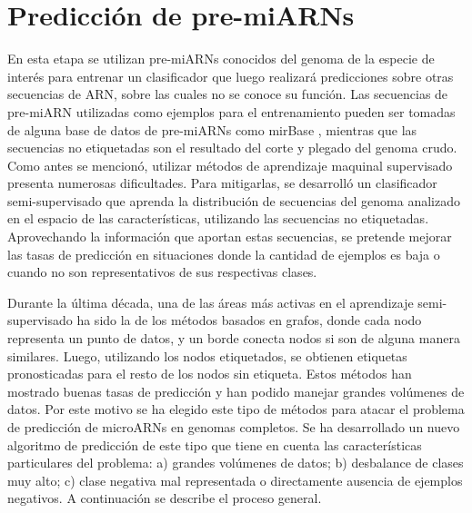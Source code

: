\section{Predicción de pre-miARNs}

En esta etapa se utilizan pre-miARNs conocidos del genoma de la especie de interés para entrenar un clasificador que luego realizará predicciones sobre otras
secuencias de ARN, sobre las cuales no se  conoce su función. Las secuencias de pre-miARN utilizadas como ejemplos para el entrenamiento pueden ser tomadas de
alguna base de datos de pre-miARNs como  mirBase \cite{kozomara2014mirbase}, mientras que las secuencias no etiquetadas son el resultado del corte y plegado del genoma
crudo. Como antes se mencionó, utilizar métodos de aprendizaje maquinal supervisado presenta numerosas dificultades. Para mitigarlas, se desarrolló
un clasificador semi-supervisado que aprenda la distribución de secuencias del genoma analizado en el espacio de las características, utilizando las
secuencias no etiquetadas. Aprovechando la información que aportan estas secuencias, se pretende mejorar las tasas de predicción en situaciones donde la
cantidad de ejemplos es baja o cuando no son representativos de sus respectivas clases.

Durante la última década, una de las áreas más activas en el aprendizaje semi-supervisado ha sido la de los métodos basados en grafos, donde cada nodo
representa un punto de datos, y un borde conecta nodos si son de alguna manera similares. Luego, utilizando los nodos etiquetados, se obtienen etiquetas
pronosticadas para el resto de los nodos sin etiqueta. Estos métodos han mostrado buenas tasas de predicción \citep{joachims2003transductive} y han podido
manejar grandes volúmenes de datos. Por este motivo se ha elegido este tipo de métodos para atacar el problema de predicción de microARNs en genomas
completos. Se ha desarrollado un nuevo algoritmo de predicción de este tipo que tiene en cuenta las características particulares del problema: a) grandes
volúmenes de datos; b) desbalance de clases muy alto; c) clase negativa mal representada o directamente ausencia de ejemplos negativos. A continuación se
describe el proceso general.

